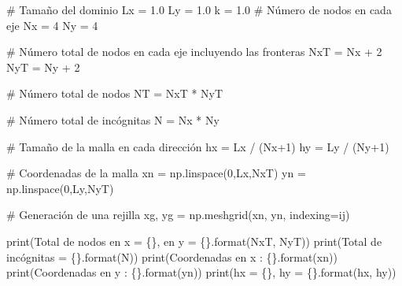 \documentclass[
  letterpaper,
  DIV=11,
  numbers=noendperiod]{scrreprt}
\newenvironment{Shaded}{\begin{snugshade}}{\end{snugshade}}
\newcommand{\BuiltInTok}[1]{\textcolor[rgb]{0.00,0.23,0.31}{#1}}
\newcommand{\CommentTok}[1]{\textcolor[rgb]{0.37,0.37,0.37}{#1}}
\newcommand{\DecValTok}[1]{\textcolor[rgb]{0.68,0.00,0.00}{#1}}
\newcommand{\FloatTok}[1]{\textcolor[rgb]{0.68,0.00,0.00}{#1}}
\newcommand{\NormalTok}[1]{\textcolor[rgb]{0.00,0.23,0.31}{#1}}
\newcommand{\OperatorTok}[1]{\textcolor[rgb]{0.37,0.37,0.37}{#1}}
\newcommand{\SpecialCharTok}[1]{\textcolor[rgb]{0.37,0.37,0.37}{#1}}
\newcommand{\StringTok}[1]{\textcolor[rgb]{0.13,0.47,0.30}{#1}}
\begin{document}
\begin{Shaded}
\begin{Highlighting}[]
\CommentTok{\# Tamaño del dominio}
\NormalTok{Lx }\OperatorTok{=} \FloatTok{1.0}
\NormalTok{Ly }\OperatorTok{=} \FloatTok{1.0}
\NormalTok{k }\OperatorTok{=} \FloatTok{1.0}
\CommentTok{\# Número de nodos en cada eje}
\NormalTok{Nx }\OperatorTok{=} \DecValTok{4}
\NormalTok{Ny }\OperatorTok{=} \DecValTok{4}

\CommentTok{\# Número total de nodos en cada eje incluyendo las fronteras}
\NormalTok{NxT }\OperatorTok{=}\NormalTok{ Nx }\OperatorTok{+} \DecValTok{2}
\NormalTok{NyT }\OperatorTok{=}\NormalTok{ Ny }\OperatorTok{+} \DecValTok{2}

\CommentTok{\# Número total de nodos}
\NormalTok{NT }\OperatorTok{=}\NormalTok{ NxT }\OperatorTok{*}\NormalTok{ NyT}

\CommentTok{\# Número total de incógnitas}
\NormalTok{N }\OperatorTok{=}\NormalTok{ Nx }\OperatorTok{*}\NormalTok{ Ny}

\CommentTok{\# Tamaño de la malla en cada dirección}
\NormalTok{hx }\OperatorTok{=}\NormalTok{ Lx }\OperatorTok{/}\NormalTok{ (Nx}\OperatorTok{+}\DecValTok{1}\NormalTok{)}
\NormalTok{hy }\OperatorTok{=}\NormalTok{ Ly }\OperatorTok{/}\NormalTok{ (Ny}\OperatorTok{+}\DecValTok{1}\NormalTok{)}

\CommentTok{\# Coordenadas de la malla}
\NormalTok{xn }\OperatorTok{=}\NormalTok{ np.linspace(}\DecValTok{0}\NormalTok{,Lx,NxT)}
\NormalTok{yn }\OperatorTok{=}\NormalTok{ np.linspace(}\DecValTok{0}\NormalTok{,Ly,NyT)}

\CommentTok{\# Generación de una rejilla}
\NormalTok{xg, yg }\OperatorTok{=}\NormalTok{ np.meshgrid(xn, yn, indexing}\OperatorTok{=}\StringTok{\textquotesingle{}ij\textquotesingle{}}\NormalTok{)}
\end{Highlighting}
\end{Shaded}

\begin{Shaded}
\begin{Highlighting}[]
\BuiltInTok{print}\NormalTok{(}\StringTok{\textquotesingle{}Total de nodos en x = }\SpecialCharTok{\{\}}\StringTok{, en y = }\SpecialCharTok{\{\}}\StringTok{\textquotesingle{}}\NormalTok{.}\BuiltInTok{format}\NormalTok{(NxT, NyT))}
\BuiltInTok{print}\NormalTok{(}\StringTok{\textquotesingle{}Total de incógnitas = }\SpecialCharTok{\{\}}\StringTok{\textquotesingle{}}\NormalTok{.}\BuiltInTok{format}\NormalTok{(N))}
\BuiltInTok{print}\NormalTok{(}\StringTok{\textquotesingle{}Coordenadas en x : }\SpecialCharTok{\{\}}\StringTok{\textquotesingle{}}\NormalTok{.}\BuiltInTok{format}\NormalTok{(xn))}
\BuiltInTok{print}\NormalTok{(}\StringTok{\textquotesingle{}Coordenadas en y : }\SpecialCharTok{\{\}}\StringTok{\textquotesingle{}}\NormalTok{.}\BuiltInTok{format}\NormalTok{(yn))}
\BuiltInTok{print}\NormalTok{(}\StringTok{\textquotesingle{}hx = }\SpecialCharTok{\{\}}\StringTok{, hy = }\SpecialCharTok{\{\}}\StringTok{\textquotesingle{}}\NormalTok{.}\BuiltInTok{format}\NormalTok{(hx, hy))}
\end{Highlighting}
\end{Shaded}
\end{document}
